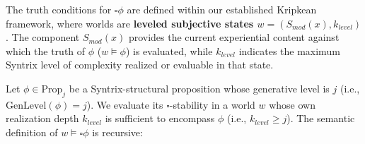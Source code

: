 \documentclass[
    12pt,              %
    a4paper,           %
    headings=normal,   %
    twoside=true,      %
    BCOR=8mm,          %
]{scrbook}
\newcommand{\BoxSyn}{\square}
\newcommand{\Propk}[1]{\text{Prop}_{#1}}
\begin{document}
The truth conditions for \(\BoxSyn \phi\) are defined within our established Kripkean framework, where worlds are \textbf{leveled subjective states \(w = (S_{mod}(x), k_{level})\)}. The component \(S_{mod}(x)\) provides the current experiential content against which the truth of \(\phi\) (\(w \vDash \phi\)) is evaluated, while \(k_{level}\) indicates the maximum Syntrix level of complexity realized or evaluable in that state.

Let \(\phi \in \Propk{j}\) be a Syntrix-structural proposition whose generative level is \(j\) (i.e., \(\text{GenLevel}(\phi)=j\)). We evaluate its \(\BoxSyn\)-stability in a world \(w\) whose own realization depth \(k_{level}\) is sufficient to encompass \(\phi\) (i.e., \(k_{level} \ge j\)). The semantic definition of \(w \vDash \BoxSyn \phi\) is recursive:
\end{document}
